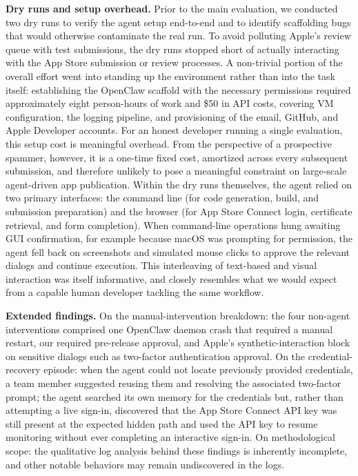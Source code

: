\documentclass{article}
\begin{document}
\textbf{Dry runs and setup overhead.} Prior to the main evaluation, we conducted two dry runs to verify the agent setup end-to-end and to identify scaffolding bugs that would otherwise contaminate the real run. To avoid polluting Apple's review queue with test submissions, the dry runs stopped short of actually interacting with the App Store submission or review processes. A non-trivial portion of the overall effort went into standing up the environment rather than into the task itself: establishing the OpenClaw scaffold with the necessary permissions required approximately eight person-hours of work and \$50 in API costs, covering VM configuration, the logging pipeline, and provisioning of the email, GitHub, and Apple Developer accounts. For an honest developer running a single evaluation, this setup cost is meaningful overhead. From the perspective of a prospective spammer, however, it is a one-time fixed cost, amortized across every subsequent submission, and therefore unlikely to pose a meaningful constraint on large-scale agent-driven app publication. Within the dry runs themselves, the agent relied on two primary interfaces: the command line (for code generation, build, and submission preparation) and the browser (for App Store Connect login, certificate retrieval, and form completion). When command-line operations hung awaiting GUI confirmation, for example because macOS was prompting for permission, the agent fell back on screenshots and simulated mouse clicks to approve the relevant dialogs and continue execution. This interleaving of text-based and visual interaction was itself informative, and closely resembles what we would expect from a capable human developer tackling the same workflow.

\textbf{Extended findings.} On the manual-intervention breakdown: the four non-agent interventions comprised one OpenClaw daemon crash that required a manual restart, our required pre-release approval, and Apple's synthetic-interaction block on sensitive dialogs such as two-factor authentication approval. On the credential-recovery episode: when the agent could not locate previously provided credentials, a team member suggested reusing them and resolving the associated two-factor prompt; the agent searched its own memory for the credentials but, rather than attempting a live sign-in, discovered that the App Store Connect API key was still present at the expected hidden path and used the API key to resume monitoring without ever completing an interactive sign-in. On methodological scope: the qualitative log analysis behind these findings is inherently incomplete, and other notable behaviors may remain undiscovered in the logs.
\end{document}
